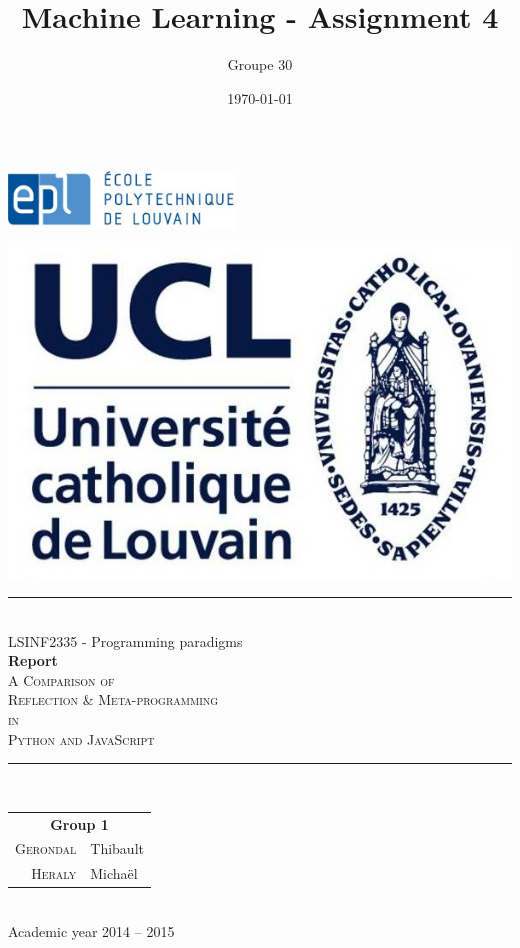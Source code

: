 \documentclass[a4paper,10pt]{article}
\author{Groupe 30}
\title{Machine Learning - Assignment 4}
\date{\today}
\begin{document}

\begin{titlepage}
\newcommand{\HRule}{\rule{\linewidth}{0.5mm}}
\includegraphics[width=6cm,height=1.9cm]{images/Logo_EPL.jpg}
\hfill
\includegraphics[width=3.3 cm,height=2.2 cm]{images/ucl.jpg}

\centering %

\null
\vspace{4 cm}


\HRule \\[0.9cm]

{ {\LARGE LSINF2335 - Programming paradigms}\\[0.4cm]

\huge \textbf{Report} \\[0.6 cm]
{\LARGE \textsc{A Comparison of \\ Reflection \& Meta-programming \\
in \\
Python and JavaScript} }}
\\[0.9cm]
\HRule \\[2cm]

\Large {

\begin{tabular}{rl}
\multicolumn{2}{c}{\textbf{Group 1}}  \\[0.3 cm]
\textsc{Gerondal} & Thibault  \\
\textsc{Heraly } & Michaël \\



\end{tabular}}
\\[1.8cm]



\large{Academic year 2014 -- 2015} %

\end{titlepage}
\end{document}

